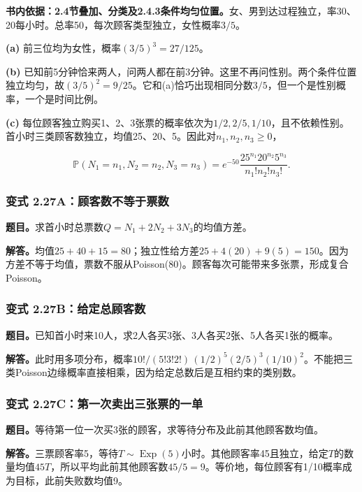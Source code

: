 \documentclass[12pt,a4paper,UTF8,fontset=fandol]{ctexart}
\begin{document}
\textbf{书内依据：2.4节叠加、分类及2.4.3条件均匀位置。}女、男到达过程独立，率30、20每小时。总率50，每次顾客类型独立，女性概率\(3/5\)。

\textbf{(a)} 前三位均为女性，概率\(\boxed{(3/5)^3=27/125}\)。

\textbf{(b)}
已知前5分钟恰来两人，问两人都在前3分钟。这里不再问性别。两个条件位置独立均匀，故\(\boxed{(3/5)^2=9/25}\)。它和(a)恰巧出现相同分数\(3/5\)，但一个是性别概率，一个是时间比例。

\textbf{(c)}
每位顾客独立购买1、2、3张票的概率依次为\(1/2,2/5,1/10\)，且不依赖性别。首小时三类顾客数独立，均值25、20、5。因此对\(n_1,n_2,n_3\ge0\)，

\[\boxed{\mathbb P(N_1=n_1,N_2=n_2,N_3=n_3)
=e^{-50}\frac{25^{n_1}20^{n_2}5^{n_3}}{n_1!n_2!n_3!}.}\]

\subsubsection{变式
2.27A：顾客数不等于票数}\label{ux53d8ux5f0f-2.27aux987eux5ba2ux6570ux4e0dux7b49ux4e8eux7968ux6570}

\textbf{题目。}求首小时总票数\(Q=N_1+2N_2+3N_3\)的均值方差。

\textbf{解答。}均值\(25+40+15=80\)；独立性给方差\(25+4(20)+9(5)=150\)。因为方差不等于均值，票数不服从Poisson(80)。顾客每次可能带来多张票，形成复合Poisson。

\subsubsection{变式
2.27B：给定总顾客数}\label{ux53d8ux5f0f-2.27bux7ed9ux5b9aux603bux987eux5ba2ux6570}

\textbf{题目。}已知首小时来10人，求2人各买3张、3人各买2张、5人各买1张的概率。

\textbf{解答。}此时用多项分布，概率\(10!/(5!3!2!)\,(1/2)^5(2/5)^3(1/10)^2\)。不能把三类Poisson边缘概率直接相乘，因为给定总数后是互相约束的类别数。

\subsubsection{变式
2.27C：第一次卖出三张票的一单}\label{ux53d8ux5f0f-2.27cux7b2cux4e00ux6b21ux5356ux51faux4e09ux5f20ux7968ux7684ux4e00ux5355}

\textbf{题目。}等待第一位一次买3张的顾客，求等待分布及此前其他顾客数均值。

\textbf{解答。}三票顾客率5，等待\(T\sim\operatorname{Exp}(5)\)小时。其他顾客率45且独立，给定\(T\)的数量均值\(45T\)，所以平均此前其他顾客数\(45/5=9\)。等价地，每位顾客有1/10概率成为目标，此前失败数均值9。
\end{document}
